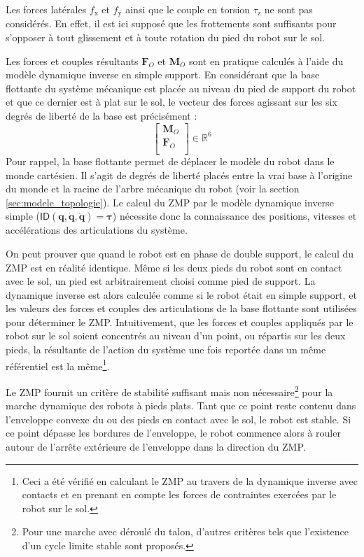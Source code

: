 Les forces latérales $f_{\text{x}}$ et $f_{\text{y}}$ ainsi que
le couple en torsion $\tau_{\text{z}}$ ne sont pas considérés.
En effet, il est ici supposé que les frottements sont suffisants
pour s'opposer à tout glissement et à toute rotation du pied 
du robot sur le sol.

Les forces et couples résultants $\bm{F}_{O}$ et $\bm{M}_{O}$ sont
en pratique calculés à l'aide du modèle dynamique inverse en simple support.
En considérant que la base flottante du système mécanique est placée au niveau 
du pied de support du robot et que ce dernier est à plat sur le sol, 
le vecteur des forces agissant sur les 
six degrés de liberté de la base est précisément :
$$
\begin{bmatrix}
    \bm{M}_{O} \\ 
    \bm{F}_{O} \\
\end{bmatrix} \in \mathbb{R}^{6}
$$
Pour rappel, la base flottante permet de déplacer le modèle du robot dans
le monde cartésien. Il s'agit de degrés de liberté placés entre la vrai
base à l'origine du monde et la racine de l'arbre mécanique du robot
(voir la section \ref{sec:modele_topologie}).
Le calcul du ZMP par le modèle dynamique inverse simple 
($\mathsf{ID}(\bm{q}, \bm{\dot{q}}, \bm{\ddot{q}}) = \bm{\tau}$) nécessite donc
la connaissance des positions, vitesses et accélérations des articulations
du système.

On peut prouver que quand le robot est en phase de double support, 
le calcul du ZMP est en réalité identique.
Même si les deux pieds du robot sont en contact avec le sol,
un pied est arbitrairement choisi comme pied de support.
La dynamique inverse est alors calculée comme si le robot
était en simple support, et les valeurs des forces et couples
des articulations de la base flottante sont utilisées pour déterminer le ZMP.
Intuitivement, que les forces et couples appliqués par le robot sur le sol
soient concentrés au niveau d'un point, ou répartis sur les deux pieds,
la résultante de l'action du système une fois reportée dans un même 
référentiel est la même\footnote{Ceci a été vérifié en calculant 
le ZMP au travers de la dynamique inverse avec contacts et en prenant 
en compte les forces de contraintes exercées par le robot sur le sol.}.

Le ZMP fournit un critère de stabilité suffisant 
mais non nécessaire\footnote{Pour une marche avec déroulé du talon, 
d'autres critères tels que l'existence d'un cycle limite stable sont proposés.}
pour la marche dynamique des robots à pieds plats. 
Tant que ce point reste contenu dans l'enveloppe
convexe du ou des pieds en contact avec le sol, le robot est stable.
Si ce point dépasse les bordures de l'enveloppe, le robot commence alors 
à rouler autour de l'arrête extérieure de l'enveloppe dans la direction du ZMP.

